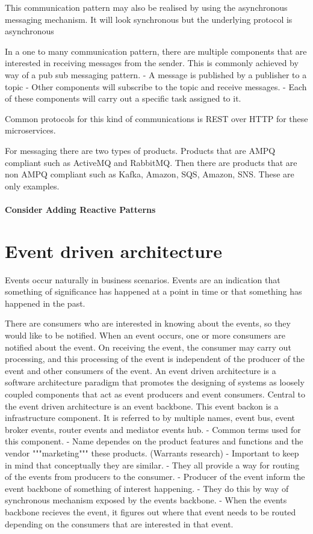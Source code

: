 \documentclass[a4paper, 11pt]{book}
\begin{document}
{    This communication pattern may also be realised by using the asynchronous messaging mechanism.
    It will look synchronous but the underlying protocol is asynchronous



    In a one to many communication pattern, there are multiple components that are interested in receiving messages from the sender.
    This is commonly achieved by way of a pub sub messaging pattern.
    - A message is published by a publisher to a topic
    - Other components will subscribe to the topic and receive messages.
        - Each of these components will carry out a specific task assigned to it.

    Common protocols for this kind of communications is REST over HTTP for these microservices.



    For messaging there are two types of products. Products that are AMPQ compliant such as ActiveMQ and RabbitMQ.
    Then there are products that are non AMPQ compliant such as Kafka, Amazon, SQS, Amazon, SNS. These are only examples.

    \paragraph{Consider Adding Reactive Patterns}

    \section{Event driven architecture}
    Events occur naturally in business scenarios.
    Events are an indication that something of significance has happened at a point in time or that something has happened in the past.

    There are consumers who are interested in knowing about the events, so they would like to be notified.
    When an event occurs, one or more consumers are notified about the event.
    On receiving the event, the consumer may carry out processing, and this processing of the event is independent of the producer of the event and other consumers of the event.
    An event driven architecture is a software architecture paradigm that promotes the designing of systems as loosely coupled components that act as event producers and event consumers.
    Central to the event driven architecture is an event backbone.
    This event backon is a infrastructure component.
    It is referred to by multiple names, event bus, event broker events, router events and mediator events hub.
    - Common terms used for this component.
    - Name dependes on the product features and functions and the vendor """marketing""" these products. (Warrants research)
    - Important to keep in mind that conceptually they are similar.
    - They all provide a way for routing of the events from producers to the consumer.
    - Producer of the event inform the event backbone of something of interest happening.
    - They do this by way of synchronous mechanism exposed by the events backbone.
    - When the events backbone recieves the event, it figures out where that event needs to be routed depending on the consumers that are interested in that event.

}
\end{document}
